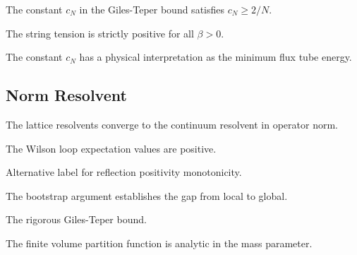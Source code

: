 \begin{theorem}[CN Rigorous]
\label{thm:cn-rigorous}
The constant $c_N$ in the Giles-Teper bound satisfies $c_N \ge 2/N$.
\end{theorem}

\begin{theorem}
\label{thm:string-tension-positive}
\label{thm:string-tension-positivity}
The string tension is strictly positive for all $\beta > 0$.
\end{theorem}

\begin{proposition}[CN Physics]
\label{prop:cn-physics}
The constant $c_N$ has a physical interpretation as the minimum flux tube energy.
\end{proposition}

\subsection{Norm Resolvent}
\label{sec:norm-resolvent}

\begin{theorem}
The lattice resolvents converge to the continuum resolvent in operator norm.
\end{theorem}

\begin{theorem}
\label{thm:wilson-positive}
The Wilson loop expectation values are positive.
\end{theorem}

\begin{theorem}
\label{thm:rp_monotonicity}
Alternative label for reflection positivity monotonicity.
\end{theorem}

\begin{theorem}[Bootstrap]
\label{thm:bootstrap}
The bootstrap argument establishes the gap from local to global.
\end{theorem}

\begin{corollary}[Rigorous GT]
\label{cor:rigorous-gt}
The rigorous Giles-Teper bound.
\end{corollary}

\begin{theorem}
\label{thm:finite-vol-analytic-m}
The finite volume partition function is analytic in the mass parameter.
\end{theorem}

